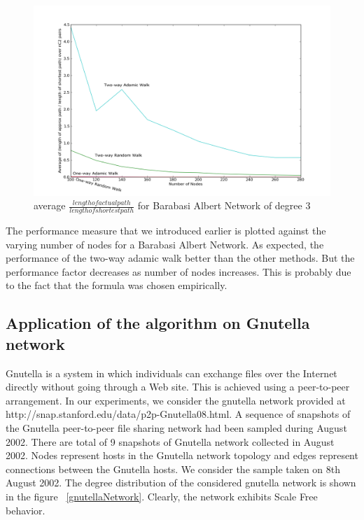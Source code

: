 \documentclass[a4paper,12pt]{article}
\begin{document}
\begin{figure}[htp]
\centering
\includegraphics[scale=0.30]{Results/SFNperformance.png}
\caption{average $\frac{length of actual path}{length of shortest path}$ for Barabasi Albert Network of degree 3}
\label{SFNperformance}
\end{figure}
The performance measure that we introduced earlier is plotted against the varying number of nodes for a Barabasi Albert Network. As expected, the performance of the two-way adamic walk better than the other methods. But the performance factor decreases as number of nodes increases. This is probably due to the fact that the formula was chosen empirically.


\subsection{Application of the algorithm on Gnutella network}
Gnutella is a system in which individuals can exchange files over the Internet directly without going through a Web site. This is achieved using a peer-to-peer arrangement. In our experiments, we consider the gnutella network provided at\\ http://snap.stanford.edu/data/p2p-Gnutella08.html. A sequence of snapshots of the Gnutella peer-to-peer file sharing network had been sampled during August 2002. There are total of 9 snapshots of Gnutella network collected in August 2002. Nodes represent hosts in the Gnutella network topology and edges represent connections between the Gnutella hosts. We consider the sample taken on 8th August 2002. The degree distribution of the considered gnutella network is shown in the figure ~\ref{gnutellaNetwork}. Clearly, the network exhibits Scale Free behavior.\\
\end{document}
